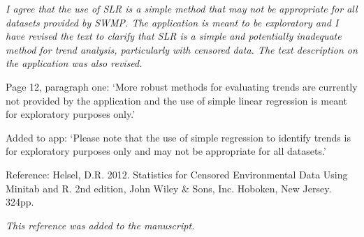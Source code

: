\documentclass[letterpaper,12pt]{article}\usepackage[]{graphicx}\usepackage[]{color}
\begin{document}
{\it I agree that the use of SLR is a simple method that may not be appropriate for all datasets provided by SWMP.  The application is meant to be exploratory and I have revised the text to clarify that SLR is a simple and potentially inadequate method for trend analysis, particularly with censored data.  The text description on the application was also revised.

Page 12, paragraph one: `More robust methods for evaluating trends are currently not provided by the application and the use of simple linear regression is meant for exploratory purposes only.'

Added to app: `Please note that the use of simple regression to identify trends is for exploratory purposes only and may not be appropriate for all datasets.'
}

Reference:
Helsel, D.R. 2012. Statistics for Censored Environmental Data Using Minitab and R. 2nd edition, John Wiley \& Sons, Inc. Hoboken, New Jersey. 324pp.

{\it This reference was added to the manuscript.}
\end{document}
